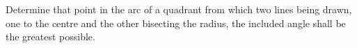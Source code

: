 Determine that point in the arc of a quadrant 
from which two lines being drawn, one to the 
centre and the other bisecting the radius, the 
included angle shall be the greatest possible.
